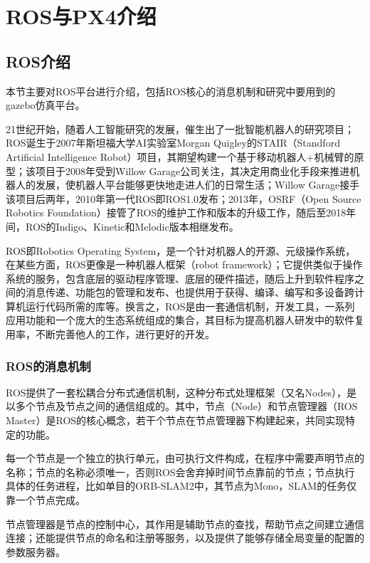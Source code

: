 
\chapter{ROS与PX4介绍}\label{introduction}

\section{ROS介绍}
本节主要对ROS平台进行介绍，包括ROS核心的消息机制和研究中要用到的gazebo仿真平台。

21世纪开始，随着人工智能研究的发展，催生出了一批智能机器人的研究项目；ROS诞生于2007年斯坦福大学AI实验室Morgan Quigley的STAIR（Standford Artificial Intelligence Robot）项目，其期望构建一个基于移动机器人+机械臂的原型；该项目于2008年受到Willow Garage公司关注，其决定用商业化手段来推进机器人的发展，使机器人平台能够更快地走进人们的日常生活；Willow Garage接手该项目后两年，2010年第一代ROS即ROS1.0发布；2013年，OSRF（Open Source Robotics Foundation）接管了ROS的维护工作和版本的升级工作，随后至2018年间，ROS的Indigo、Kinetic和Melodic版本相继发布。

ROS即Robotics Operating System，是一个针对机器人的开源、元级操作系统，在某些方面，ROS更像是一种机器人框架（robot framework）；它提供类似于操作系统的服务，包含底层的驱动程序管理、底层的硬件描述，随后上升到软件程序之间的消息传递、功能包的管理和发布、也提供用于获得、编译、编写和多设备跨计算机运行代码所需的库等。换言之，ROS是由一套通信机制，开发工具，一系列应用功能和一个庞大的生态系统组成的集合，其目标为提高机器人研发中的软件复用率，不断完善他人的工作，进行更好的开发。

\subsection{ROS的消息机制} \label{2.1.1}

ROS提供了一套松耦合分布式通信机制，这种分布式处理框架（又名Nodes），是以多个节点及节点之间的通信组成的。其中，节点（Node）和节点管理器（ROS Master）是ROS的核心概念，若干个节点在节点管理器下构建起来，共同实现特定的功能。

每一个节点是一个独立的执行单元，由可执行文件构成，在程序中需要声明节点的名称；节点的名称必须唯一，否则ROS会舍弃掉时间节点靠前的节点；节点执行具体的任务进程，比如单目的ORB-SLAM2中，其节点为Mono，SLAM的任务仅靠一个节点完成。

节点管理器是节点的控制中心，其作用是辅助节点的查找，帮助节点之间建立通信连接；还能提供节点的命名和注册等服务，以及提供了能够存储全局变量的配置的参数服务器。


